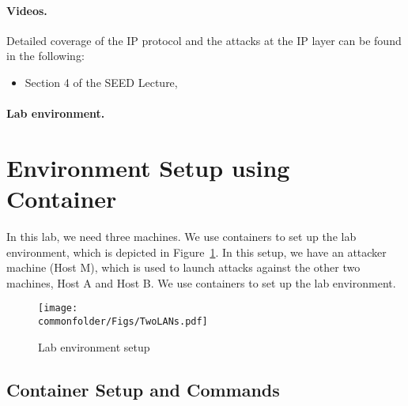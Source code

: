\paragraph{Videos.}
Detailed coverage of the IP protocol and the attacks at the IP layer can be found 
in the following:

\begin{itemize}
\item Section 4 of the SEED Lecture, \seedisvideo
\end{itemize}


\paragraph{Lab environment.} \seedenvironmentB



\section{Environment Setup using Container}

In this lab, we need three machines. We use
containers to set up the lab environment, which is depicted
in Figure~\ref{ip:fig:labsetup}.
In this setup, we have an attacker machine (Host M),
which is used to launch attacks against the other two machines, Host A and
Host B.  We use containers to set up the lab environment.

\begin{figure}[htb]
\begin{center}
\texttt{[image: \\commonfolder/Figs/TwoLANs.pdf]}
\end{center}
\caption{Lab environment setup}
\label{ip:fig:labsetup}
\end{figure}



\subsection{Container Setup and Commands}




